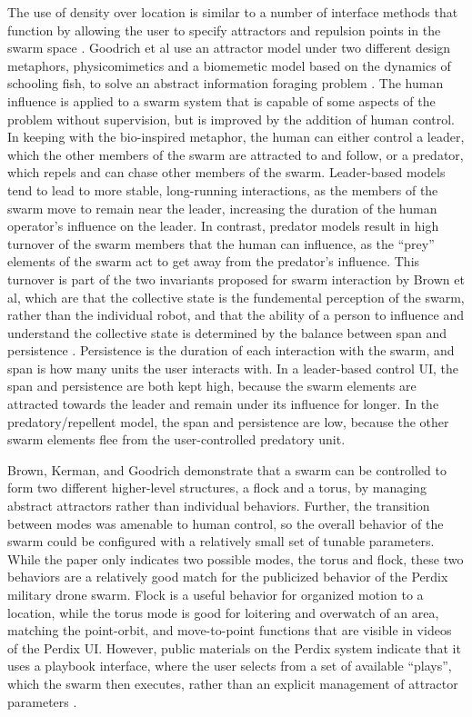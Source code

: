 The use of density over location is similar to a number of interface methods that function by allowing the user to specify attractors and repulsion points in the swarm space \citep{goodrich2011toward, brown2014human, vasile2011integrating, kira2009exerting}. 
Goodrich et al use an attractor model under two different design metaphors, physicomimetics and a biomemetic model based on the dynamics of schooling fish, to solve an abstract information foraging problem \citep{goodrich2011toward}. 
The human influence is applied to a swarm system that is capable of some aspects of the problem without supervision, but is improved by the addition of human control. 
In keeping with the bio-inspired metaphor, the human can either control a leader, which the other members of the swarm are attracted to and follow, or a predator, which repels and can chase other members of the swarm. 
Leader-based models tend to lead to more stable, long-running interactions, as the members of the swarm move to remain near the leader, increasing the duration of the human operator's influence on the leader. 
In contrast, predator models result in high turnover of the swarm members that the human can influence, as the ``prey'' elements of the swarm act to get away from the predator's influence. 
This turnover is part of the two invariants proposed for swarm interaction by Brown et al, which are that the collective state is the fundemental perception of the swarm, rather than the individual robot, and that the ability of a person to influence and understand the collective state is determined by the balance between span and persistence \citep{brown2015two}. 
Persistence is the duration of each interaction with the swarm, and span is how many units the user interacts with. 
In a leader-based control UI, the span and persistence are both kept high, because the swarm elements are attracted towards the leader and remain under its influence for longer. 
In the predatory/repellent model, the span and persistence are low, because the other swarm elements flee from the user-controlled predatory unit. 

Brown, Kerman, and Goodrich demonstrate that a swarm can be controlled to form two different higher-level structures, a flock and a torus, by managing abstract attractors rather than individual behaviors. 
Further, the transition between modes was amenable to human control, so the overall behavior of the swarm could be configured with a relatively small set of tunable parameters. 
While the paper only indicates two possible modes, the torus and flock, these two behaviors are a relatively good match for the publicized behavior of the Perdix military drone swarm. 
Flock is a useful behavior for organized motion to a location, while the torus mode is good for loitering and overwatch of an area, matching the point-orbit, and move-to-point functions that are visible in videos of the Perdix UI. 
However, public materials on the Perdix system indicate that it uses a playbook interface, where the user selects from a set of available ``plays'', which the swarm then executes, rather than an explicit management of attractor parameters \citep{PerdixFactsheet}. 

